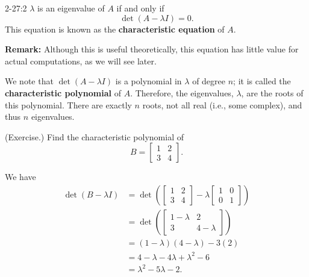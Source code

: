 \documentclass[letterpaper]{article}
\newcommand{\0}{\mathbf{0}}
\begin{document}
\begin{theorem}{}{2-27:2}
    $\lambda$ is an eigenvalue of $A$ if and only if 
    \[\det(A - \lambda I) = 0.\]
    This equation is known as the \textbf{characteristic equation} of $A$.
\end{theorem}
\textbf{Remark:} Although this is useful theoretically, this equation has little value for actual computations, as we will see later. 

We note that $\det(A - \lambda I)$ is a polynomial in $\lambda$ of degree $n$; it is called the \textbf{characteristic polynomial} of $A$. Therefore, the eigenvalues, $\lambda$, are the roots of this polynomial. There are exactly $n$ roots, not all real (i.e., some complex), and thus $n$ eigenvalues.

\begin{mdframed}
    (Exercise.) Find the characteristic polynomial of \[B = \begin{bmatrix}
        1 & 2 \\ 3 & 4
    \end{bmatrix}.\]

    \begin{mdframed}
        We have 
        \begin{equation*}
            \begin{aligned}
                \det(B - \lambda I) &= \det\left(\begin{bmatrix}
                    1 & 2 \\ 3 & 4
                \end{bmatrix} - \lambda \begin{bmatrix}
                    1 & 0 \\ 0 & 1
                \end{bmatrix}\right) \\ 
                    &= \det\left(\begin{bmatrix}
                        1 - \lambda & 2 \\ 
                        3 & 4 - \lambda
                    \end{bmatrix}\right) \\ 
                    &= (1 - \lambda)(4 - \lambda) - 3(2) \\ 
                    &= 4 - \lambda - 4\lambda + \lambda^2 - 6 \\ 
                    &= \lambda^2 - 5\lambda - 2.
            \end{aligned}
        \end{equation*}
    \end{mdframed}
\end{mdframed}
\end{document}
